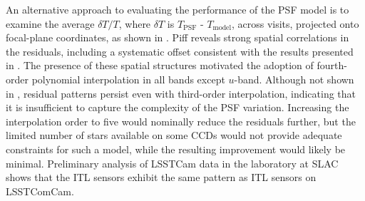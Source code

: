 An alternative approach to evaluating the performance of the \gls{PSF} model is to examine the average $\delta T/T$, where $\delta T$ is $T_{\text{PSF}}$ - $T_{\text{model}}$, across visits, projected onto focal-plane coordinates, as shown in . 
Piff reveals strong spatial correlations in the residuals, including a systematic offset consistent with the results presented in . 
The presence of these spatial structures motivated the adoption of fourth-order polynomial interpolation in all bands except $u$-band. 
Although not shown in , residual patterns persist even with third-order interpolation, indicating that it is insufficient to capture the complexity of the PSF variation. 
Increasing the interpolation order to five would nominally reduce the residuals further, but the limited number of stars available on some CCDs would not provide adequate constraints for such a model, while the resulting improvement would likely be minimal.
Preliminary analysis of LSSTCam data in the laboratory at \gls{SLAC} shows that the \gls{ITL} sensors exhibit the same pattern as \gls{ITL} sensors on \gls{LSSTComCam}.
